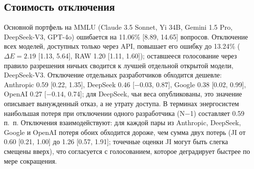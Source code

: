 \documentclass[preprint,12pt,authoryear]{elsarticle}
\newcommand{\dE}{\Delta E}
\begin{document}
\subsection{Стоимость отключения}
Основной портфель на MMLU (Claude 3.5 Sonnet, Yi 34B, Gemini 1.5 Pro, DeepSeek-V3, GPT-4o) ошибается на 11.06\% [8.89, 14.65] вопросов. Отключение всех моделей, доступных только через API, повышает его ошибку до 13.24\% ($\dE = 2.19$ [1.13, 5.64], RAW 1.20 [1.11, 1.60]); оставшееся голосование через правило разрешения ничьих сводится к лучшей отдельной открытой модели, DeepSeek-V3. Отключение отдельных разработчиков обходится дешевле: Anthropic 0.59 [0.22, 1.35], DeepSeek 0.46 [$-0.03$, 0.87], Google 0.38 [0.02, 0.99], OpenAI 0.27 [$-0.14$, 0.74]; для DeepSeek, чьи веса опубликованы, это значение описывает вынужденный отказ, а не утрату доступа. В терминах энергосистем наибольшая потеря при отключении одного разработчика (N$-$1) составляет 0.59 п.~п. Отключения взаимодействуют: для каждой пары из Anthropic, DeepSeek, Google и OpenAI потеря обоих обходится дороже, чем сумма двух потерь (JI от 0.60 [0.21, 1.00] до 1.26 [0.57, 1.91]; точечные оценки JI могут быть слегка смещены вверх), что согласуется с голосованием, которое деградирует быстрее по мере сокращения.
\end{document}
